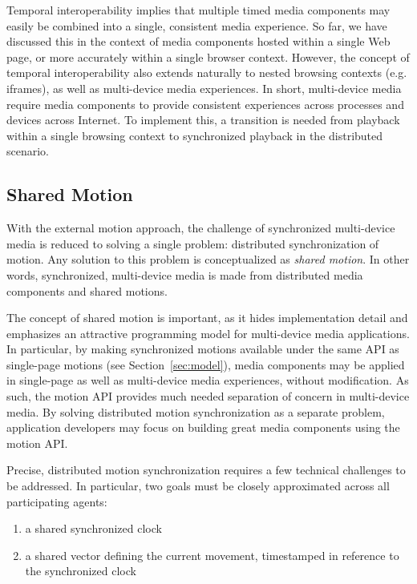 Temporal interoperability implies that multiple timed media components may
easily be combined into a single, consistent media experience. So far, we have
discussed this in the context of media components hosted within a single Web
page, or more accurately within a single browser context. However, the concept
of temporal interoperability also extends naturally to nested browsing
contexts (e.g. iframes), as well as multi-device media experiences. In short,
multi-device media require media components to provide consistent experiences
across processes and devices across Internet. To implement this, a transition
is needed from playback within a single browsing context to synchronized
playback in the distributed scenario.

\subsection {Shared Motion}

With the external motion approach, the challenge of synchronized multi-device
media is reduced to solving a single problem: distributed synchronization of
motion. Any solution to this problem is conceptualized as \emph{shared motion}. In
other words, synchronized, multi-device media is made from distributed media
components and shared motions.

The concept of shared motion is important, as it hides implementation detail
and emphasizes an attractive programming model for multi-device media
applications. In particular, by making synchronized motions available under
the same API as single-page motions (see Section~\ref{sec:model}), media components may be
applied in single-page as well as multi-device media experiences, without
modification. As such, the motion API provides much needed separation of
concern in multi-device media. By solving distributed motion synchronization
as a separate problem, application developers may focus on building great
media components using the motion API.



Precise, distributed motion synchronization requires a few technical
challenges to be addressed. In particular, two goals must be closely
approximated across all participating agents:

\begin{enumerate}
\item{a shared synchronized clock}
\item{a shared vector defining the current movement, timestamped in reference to the
synchronized clock}
\end{enumerate}

